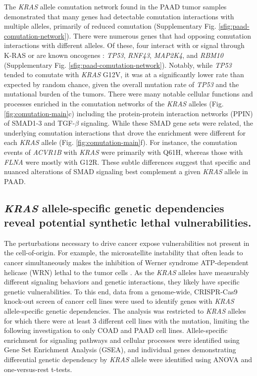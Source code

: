 \documentclass[english, 10pt, letterpaper]{article}
\newcommand{\KRAS}{\emph{KRAS}}
\newcommand{\kras}{K-RAS}
\begin{document}
The \KRAS{} allele comutation network found in the PAAD tumor samples demonstrated that many genes had detectable comutation interactions with multiple alleles, primarily of reduced comutation (Supplementary Fig. \ref{sfig:paad-comutation-network}).
There were numerous genes that had opposing comutation interactions with different alleles.
Of these, four interact with or signal through \kras{} \cite{Kovalski2019, Kanehisa2017, Kanehisa2016KEGGAnnotation.} or are known oncogenes \cite{Bamford2004TheWebsite., Sondka2018}: \emph{TP53}, \emph{RNF43}, \emph{MAP2K4}, and \emph{RBM10} (Supplementary Fig. \ref{sfig:paad-comutation-network}).
Notably, while \emph{TP53} tended to comutate with \KRAS{} G12V, it was at a significantly lower rate than expected by random chance, given the overall mutation rate of \emph{TP53} and the mutational burden of the tumors.
There were many notable cellular functions and processes enriched in the comutation networks of the \KRAS{} alleles (Fig. \ref{fig:comutation-main}c) including the protein-protein interaction networks (PPIN) of SMAD1-3 and TGF-$\beta$ signaling.
While these SMAD gene sets were related, the underlying comutation interactions that drove the enrichment were different for each \KRAS{} allele (Fig. \ref{fig:comutation-main}f).
For instance, the comutation events of \emph{ACVR1B} with \KRAS{} were primarily with Q61H, whereas those with \emph{FLNA} were mostly with G12R.
These subtle differences suggest that specific and nuanced alterations of SMAD signaling best complement a given \KRAS{} allele in PAAD.


\subsection*{\KRAS{} allele-specific genetic dependencies reveal potential synthetic lethal vulnerabilities.}

The perturbations necessary to drive cancer expose vulnerabilities not present in the cell-of-origin.
For example, the microsatellite instability that often leads to cancer simultaneously makes the inhibition of Werner syndrome ATP-dependent helicase (WRN) lethal to the tumor cells \cite{Behan2019, Chan2019}.
As the \KRAS{} alleles have measurably different signaling behaviors and genetic interactions, they likely have specific genetic vulnerabilities.
To this end, data from a genome-wide, CRISPR-Cas9 knock-out screen of cancer cell lines \cite{Tsherniak2017, Meyers2017} were used to identify genes with \KRAS{} allele-specific genetic dependencies.
The analysis was restricted to \KRAS{} alleles for which there were at least 3 different cell lines with the mutation, limiting the following investigation to only COAD and PAAD cell lines.
Allele-specific enrichment for signaling pathways and cellular processes were identified using Gene Set Enrichment Analysis (GSEA), and individual genes demonstrating differential genetic dependency by \KRAS{} allele were identified using ANOVA and one-versus-rest t-tests.
\end{document}

